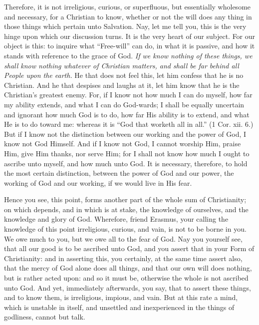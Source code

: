 Therefore, it is not irreligious, curious, or superfluous, but essentially wholesome and necessary, for a Christian to know, whether or not the will does any thing in those things which pertain unto Salvation. Nay, let me tell you, this is the very hinge upon which our discussion turns. It is the very heart of our subject. For our object is this: to inquire what “Free-will” can do, in what it is passive, and how it stands with reference to the grace of God. \emph{If we know nothing of these things, we shall know nothing whatever of Christian matters, and shall be far behind all People upon the earth. }He that does not feel this, let him confess that he is no Christian. And he that despises and laughs at it, let him know that he is the Christian’s greatest enemy. For, if I know not how much I can do myself, how far my ability extends, and what I can do God-wards; I shall be equally uncertain and ignorant how much God is to do, how far His ability is to extend, and what He is to do toward me: whereas it is “God that worketh all in all.” (1 Cor. xii. 6.) But if I know not the distinction between our working and the power of God, I know not God Himself. And if I know not God, I cannot worship Him, praise Him, give Him thanks, nor serve Him; for I shall not know how much I ought to ascribe unto myself, and how much unto God. It is necessary, therefore, to hold the most certain distinction, between the power of God and our power, the working of God and our working, if we would live in His fear.

Hence you see, this point, forms another part of the whole sum of Christianity; on which depends, and in which is at stake, the knowledge of ourselves, and the knowledge and glory of God. Wherefore, friend Erasmus, your calling the knowledge of this point irreligious, curious, and vain, is not to be borne in you. We owe much to you, but we owe all to the fear of God. Nay you yourself see, that all our good is to be ascribed unto God, and you assert that in your Form of Christianity: and in asserting this, you certainly, at the same time assert also, that the mercy of God alone does all things, and that our own will does nothing, but is rather acted upon: and so it must be, otherwise the whole is not ascribed unto God. And yet, immediately afterwards, you say, that to assert these things, and to know them, is irreligious, impious, and vain. But at this rate a mind, which is unstable in itself, and unsettled and inexperienced in the things of godliness, cannot but talk.



